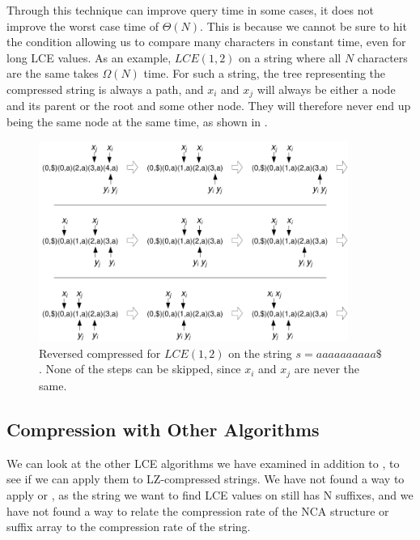 \documentclass[a4]{article}
\newcommand*{\pref}{\prettyref}
\begin{document}
Through this technique can improve query time in some cases, it does not improve the worst case time of $\Theta(N)$. This is because we cannot be sure to hit the condition allowing us to compare many characters in constant time, even for long LCE values. As an example, $LCE(1,2)$ on a string where all $N$ characters are the same takes $\Omega(N)$ time. For such a string, the tree representing the compressed string is always a path, and $x_i$ and $x_j$ will always be either a node and its parent or the root and some other node. They will therefore never end up being the same node at the same time, as shown in \pref{fig:lz-no-jumps}.

\begin{figure}[tp]
    \begin{center}
        \includegraphics[width=0.9\textwidth]{lz.pdf}
    \end{center}
    \caption{\label{fig:lz-no-jumps}Reversed compressed  for $LCE(1,2)$ on the string $s=aaaaaaaaaa\$$. None of the steps can be skipped, since $x_i$ and $x_j$ are never the same.}
\end{figure}


\subsection{Compression with Other Algorithms\label{sec:lz-other}}

We can look at the other LCE algorithms we have examined in addition to , to see if we can apply them to LZ-compressed strings. We have not found a way to apply  or , as the string we want to find LCE values on still has N suffixes, and we have not found a way to relate the compression rate of the NCA structure or suffix array to the compression rate of the string.
\end{document}
